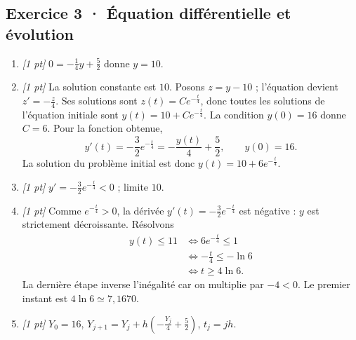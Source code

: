 \subsection*{Exercice 3 · Équation différentielle et évolution}\begin{enumerate}

\item \textit{[1 pt]} $0=-\frac{1}{4}y+\frac{5}{2}$ donne $y=10$.

\item \textit{[1 pt]} La solution constante est $10$. Posons $z=y-10$ ; l'équation devient $z'=-\frac{z}{4}$. Ses solutions sont $z(t)=Ce^{-\frac{t}{4}}$, donc toutes les solutions de l'équation initiale sont $y(t)=10+Ce^{-\frac{t}{4}}$.
La condition $y(0)=16$ donne $C=6$. Pour la fonction obtenue,
\[y'(t)=-\frac{3}{2}e^{-\frac{t}{4}}=-\frac{y(t)}{4}+\frac{5}{2},\qquad y(0)=16.\]
La solution du problème initial est donc $y(t)=10+6e^{-\frac{t}{4}}$.

\item \textit{[1 pt]} $y'=-\frac{3}{2}e^{-\frac{t}{4}}<0$ ; limite $10$.

\item \textit{[1 pt]} Comme $e^{-\frac{t}{4}}>0$, la dérivée $y'(t)=-\frac{3}{2}e^{-\frac{t}{4}}$ est négative : $y$ est strictement décroissante. Résolvons
\[\begin{aligned}y(t)\le 11&\Longleftrightarrow 6e^{-\frac{t}{4}}\le1\\&\Longleftrightarrow -\frac{t}{4}\le-\ln 6\\&\Longleftrightarrow t\ge 4\ln 6.\end{aligned}\]
La dernière étape inverse l'inégalité car on multiplie par $-4<0$. Le premier instant est $4\ln 6\simeq7{,}1670$.

\item \textit{[1 pt]} $Y_0=16$, $Y_{j+1}=Y_j+h(-\frac{Y_j}{4}+\frac{5}{2})$, $t_j=jh$.

\end{enumerate}

